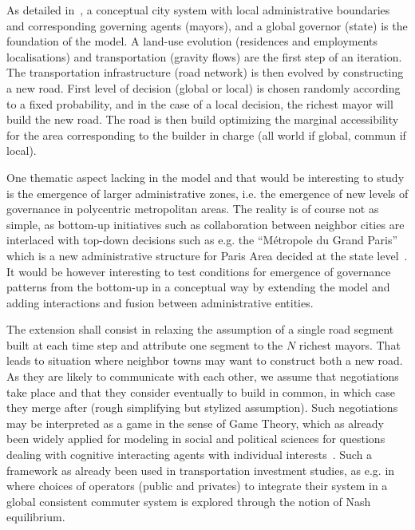As detailed in~\cite{lenechet2012}, a conceptual city system with local administrative boundaries and corresponding governing agents (mayors), and a global governor (state) is the foundation of the model. A land-use evolution (residences and employments localisations) and transportation (gravity flows) are the first step of an iteration. The transportation infrastructure (road network) is then evolved by constructing a new road. First level of decision (global or local) is chosen randomly according to a fixed probability, and in the case of a local decision, the richest mayor will build the new road. The road is then build optimizing the marginal accessibility for the area corresponding to the builder in charge (all world if global, commun if local).

One thematic aspect lacking in the model and that would be interesting to study is the emergence of larger administrative zones, i.e. the emergence of new levels of governance in polycentric metropolitan areas. The reality is of course not as simple, as bottom-up initiatives such as collaboration between neighbor cities are interlaced with top-down decisions such as e.g. the ``M{\'e}tropole du Grand Paris'' which is a new administrative structure for Paris Area decided at the state level~\cite{gilli2009paris}. It would be however interesting to test conditions for emergence of governance patterns from the bottom-up in a conceptual way by extending the model and adding interactions and fusion between administrative entities.

The extension shall consist in relaxing the assumption of a single road segment built at each time step and attribute one segment to the $N$ richest mayors. That leads to situation where neighbor towns may want to construct both a new road. As they are likely to communicate with each other, we assume that negotiations take place and that they consider eventually to build in common, in which case they merge after (rough simplifying but stylized assumption). Such negotiations may be interpreted as a game in the sense of Game Theory, which as already been widely applied for modeling in social and political sciences for questions dealing with cognitive interacting agents with individual interests~\cite{ordeshook1986game}. Such a framework as already been used in transportation investment studies, as e.g. in~\cite{Roumboutsos2008209} where choices of operators (public and privates) to integrate their system in a global consistent commuter system is explored through the notion of Nash equilibrium.

